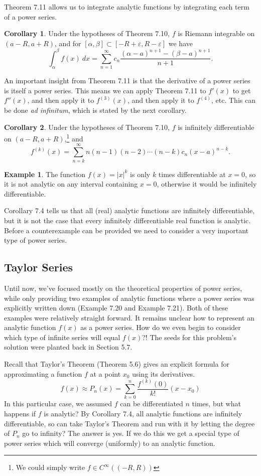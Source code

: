 \documentclass{article}
\theoremstyle{definition}
\newtheorem{corollary}{Corollary}[section]
\newtheorem{example}{Example}[section]
\begin{document}
	Theorem 7.11 allows us to integrate  analytic functions by integrating each term of a power series. 
	\begin{corollary}
		Under the hypotheses of Theorem 7.10, $ f $ is Riemann integrable on $ (a-R,a+R) $, and for $ [\alpha,\beta]\subset [-R+\varepsilon,R-\varepsilon] $ we have $$ \int_{\alpha}^{\beta}f(x)\ dx=\sum_{n=1}^{\infty}c_n\frac{(\alpha-a)^{n+1}-(\beta-a)^{n+1}}{n+1}.$$
	\end{corollary}
	
	An important insight from Theorem 7.11 is that the derivative of a power series is itself a power series. This means we can apply Theorem 7.11 to $ f'(x) $ to get $ f''(x) $, and then apply it to $ f^{(3)}(x) $, and then apply it to $ f^{(4)} $, etc. This can be done \textit{ad infinitum}, which is stated by the next corollary.  
	\begin{corollary}
		Under the hypotheses of Theorem 7.10, $ f $ is infinitely differentiable on $ (a-R,a+R) $,\footnote{We could simply write $ f\in C^\infty((-R,R)) $} and $$f^{(k)}(x)=\sum_{n=k}^{\infty}n(n-1)(n-2)\cdots(n-k)c_n(x-a)^{n-k}.$$
	\end{corollary}
	\begin{example}
		The function $ f(x)=|x|^k $ is only $ k $ times differentiable at $ x = 0 $, so it is not analytic on any interval containing $ x=0 $, otherwise it would be infinitely differentiable. 
	\end{example}
	Corollary 7.4 tells us that all (real) analytic functions are infinitely differentiable, but it is not the case that every infinitely differentiable real function is analytic. Before a counterexample can be provided we need to consider a very important type of power series.
	
	\subsection{Taylor Series}
	Until now, we've focused mostly on the theoretical properties of power series, while only providing two examples of analytic functions where a power series was explicitly written down (Example 7.20 and Example 7.21). Both of these examples were relatively straight forward. It remains unclear how to represent an analytic function $ f(x) $ as a power series. How do we even begin to consider which type of infinite series will equal $ f(x) $?! The seeds for this problem's solution were planted back in Section 5.7. 
	
	Recall that Taylor's Theorem (Theorem 5.6) gives an explicit formula for approximating a function $ f $ at a point $ x_0 $ using its derivatives. 
	$$ f(x) \approx P_n(x)=\sum_{k=0}^{n}\frac{f^{(k)}(0)}{k!}(x-x_0) $$ 
	In this particular case, we assumed $ f $ can be differentiated $ n $ times, but what happens if $ f $ is analytic? By Corollary 7.4, all analytic functions are infinitely differentiable, so can take Taylor's Theorem and run with it by letting the degree of $ P_n $ go to infinity? The answer is yes. If we do this we get a special type of power series which will converge (uniformly) to an analytic function. 
	
\end{document}
